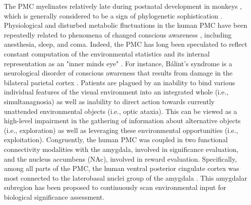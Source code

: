 \documentclass[10pt,letterpaper]{article}
\begin{document}
The PMC myelinates relatively late during postnatal development in monkeys
\citep{goldman1987development}, which is generally considered to
be a sign of phylogenetic sophistication \citep{flechsig1920}.
Physiological and disturbed metabolic fluctuations in the
human PMC have been repeatedly related to
phenomena of changed conscious awareness \citep{cavanna2006precuneus},
including anesthesia, sleep, and coma.
%
Indeed,
the PMC has long been speculated to reflect constant computation of
the environmental statistics and its internal representation
as an "inner minds eye" \citep{cavanna2006precuneus, leech_pcc2014}.
For instance, B\'alint's syndrome is a neurological disorder of conscious
awareness that results from damage in the bilateral parietal cortex
\citep{balint1909seelenlahmung}.
Patients are plagued by an
inability to bind various individual features of the visual
environment into an integrated whole (i.e., simultanagnosia)
as well as inability to direct action towards
currently unattended environmental objects
(i.e., optic ataxia).
This can be viewed as a high-level impairment in the gathering
of information about alternative objects (i.e., exploration) as well as
leveraging these environmental opportunities (i.e., exploitation).
Congruently,
the human PMC was coupled in two functional connectivity modalities
with the amygdala, involved in significance evaluation, and
the nucleus accumbens (NAc), involved in reward evaluation.
Specifically, among all parts of the PMC,
the human ventral posterior cingulate cortex was
most connected to the laterobasal
nuclei group of the amygdala
\citep{bzdok2015subspecialization}.
This amygdalar subregion has been proposed to
continuously scan environmental input
for biological significance assessment.
\end{document}
